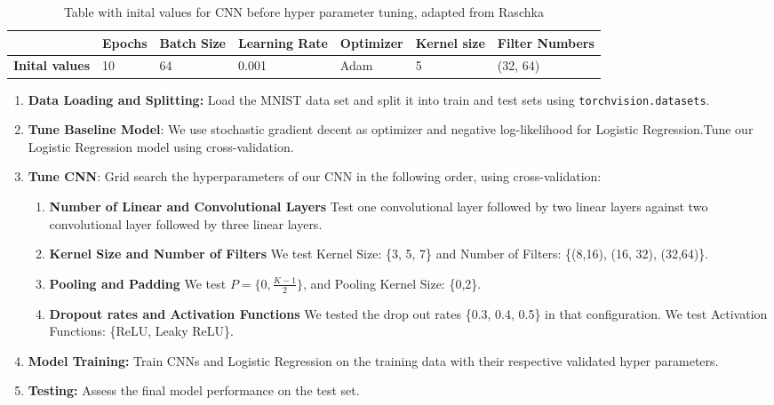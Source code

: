 \begin{table}[H]
    \centering
    \caption{Table with inital values for CNN before hyper parameter tuning, adapted from Raschka \cite{raschka2022machine}}
    
\begin{tabular}{|l|l|l|l|l|l|l|}
\hline
                       & \textbf{Epochs} & \textbf{Batch Size} & \textbf{Learning Rate} & \textbf{Optimizer} & \textbf{Kernel size} & \textbf{Filter Numbers} \\ \hline
\textbf{Inital values} & 10              & 64                  & 0.001                  & Adam               & 5                    & (32, 64)                \\ \hline
\end{tabular}
\label{tb:initialvalues}
\end{table}

\begin{enumerate}
    \item \textbf{Data Loading and Splitting:} Load the MNIST data set and split it into train and test sets using     \texttt{torchvision.datasets}. 
    \item \textbf{Tune Baseline Model}: We use stochastic gradient decent as optimizer and negative log-likelihood for Logistic Regression.Tune our Logistic Regression model using cross-validation.
    \item \textbf{Tune CNN}: Grid search the hyperparameters of our CNN in the following order, using cross-validation:
    \begin{enumerate}
        \item \textbf{Number of Linear and Convolutional Layers} Test one convolutional layer followed by two linear layers against two convolutional layer followed by three linear layers.
        \item \textbf{Kernel Size and Number of Filters}
        We test Kernel Size: \{3, 5, 7\} and Number of Filters: \{(8,16), (16, 32), (32,64)\}.
        \item \textbf{Pooling and Padding}
        We test $P = \{0,\frac {K-1}2\}$, and Pooling Kernel Size: \{0,2\}.
        \item \textbf{Dropout rates and Activation Functions}
        We tested the drop out rates \{0.3, 0.4, 0.5\} in that configuration. We test Activation Functions: \{ReLU, Leaky ReLU\}.
    \end{enumerate}
    \item \textbf{Model Training:} Train CNNs and Logistic Regression on the training data with their respective validated hyper parameters. 
    \item \textbf{Testing:} Assess the final model performance on the test set. 
\end{enumerate}


